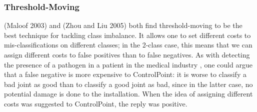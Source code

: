 \documentclass[a4paper,11pt]{article}
\begin{document}
%
%
%
%
%


\subsubsection{Threshold-Moving}

(Maloof 2003) and (Zhou and Liu 2005) both find threshold-moving to be the best technique for tackling class imbalance. It allows one to set different costs to mis-classifications on different classes; in the 2-class case, this means that we can assign different costs to false positives than to false negatives. As with detecting the presence of a pathogen in a patient in the medical industry \cite{imbalance}, one could argue that a false negative is more expensive to ControlPoint: it is worse to classify a bad joint as good than to classify a good joint as bad, since in the latter case, no potential damage is done to the installation. When the idea of assigning different costs was suggested to ControlPoint, the reply was positive. \\
\end{document}
